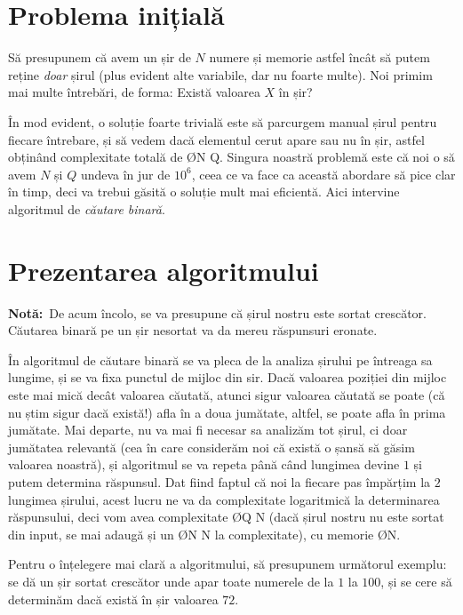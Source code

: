

\section{Problema inițială}
Să presupunem că avem un șir de $N$ numere și memorie astfel încât să putem reține \textit{doar} șirul (plus evident alte variabile, dar nu foarte multe). Noi primim mai multe întrebări, de forma: Există valoarea $X$ în șir?

În mod evident, o soluție foarte trivială este să parcurgem manual șirul pentru fiecare întrebare, și să vedem dacă elementul cerut apare sau nu în șir, astfel obținând complexitate totală de \O{N \cdot Q}. Singura noastră problemă este că noi o să avem $N$ și $Q$ undeva în jur de $10^6$, ceea ce va face ca această abordare să pice clar în timp, deci va trebui găsită o soluție mult mai eficientă. Aici intervine algoritmul de \textit{căutare binară}.

\section{Prezentarea algoritmului}
\textbf{Notă:}\ De acum încolo, se va presupune că șirul nostru este sortat crescător. Căutarea binară pe un șir nesortat va da mereu răspunsuri eronate.

În algoritmul de căutare binară se va pleca de la analiza șirului pe întreaga sa lungime, și se va fixa punctul de mijloc din sir. Dacă valoarea poziției din mijloc este mai mică decât valoarea căutată, atunci sigur valoarea căutată se poate (că nu știm sigur dacă există!) afla în a doua jumătate, altfel, se poate afla în prima jumătate. Mai departe, nu va mai fi necesar sa analizăm tot șirul, ci doar jumătatea relevantă (cea în care considerăm noi că există o șansă să găsim valoarea noastră), și algoritmul se va repeta până când lungimea devine $1$ și putem determina răspunsul. Dat fiind faptul că noi la fiecare pas împărțim la $2$ lungimea șirului, acest lucru ne va da complexitate logaritmică la determinarea răspunsului, deci vom avea complexitate \O{Q \log N} (dacă șirul nostru nu este sortat din input, se mai adaugă și un \O{N \log N} la complexitate), cu memorie \O{N}.

Pentru o înțelegere mai clară a algoritmului, să presupunem următorul exemplu: se dă un șir sortat crescător unde apar toate numerele de la $1$ la $100$, și se cere să determinăm dacă există în șir valoarea $72$.

